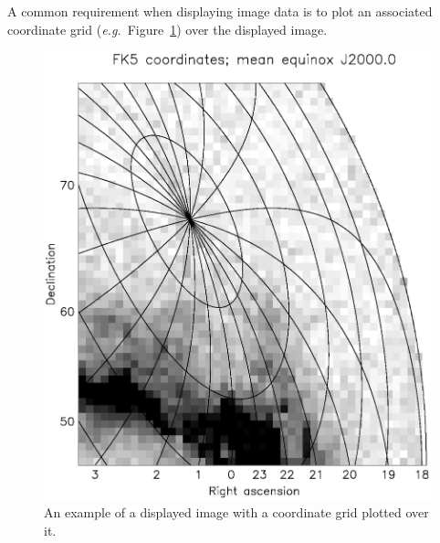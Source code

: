 \documentclass[twoside,11pt]{article}
\newenvironment{latexonly}{}{}
\begin{document}
\begin{latexonly}
   A common requirement when displaying image data is to plot an
   associated coordinate grid ({\em{e.g.}}\ Figure~\ref{fig:overgrid})
   over the displayed image.
   \begin{figure}
   \begin{center}
   \includegraphics[scale=0.7]{sun210_figures/overgrid_bw.eps}
   \caption{An example of a displayed image with a coordinate grid
   plotted over it.}
   \label{fig:overgrid}
   \end{center}
   \end{figure}
\end{latexonly}
\end{document}
